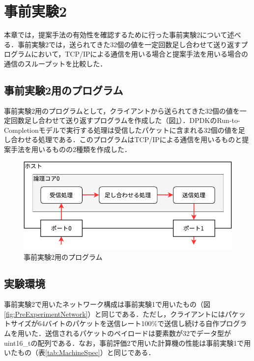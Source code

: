 \section{事前実験2}
\label{sec:PreExperimentTwo}
本章では，提案手法の有効性を確認するために行った事前実験2について述べる．事前実験2では，送られてきた32個の値を一定回数足し合わせて送り返すプログラムにおいて，TCP/IPによる通信を用いる場合と提案手法を用いる場合の通信のスループットを比較した．

\subsection{事前実験2用のプログラム}
事前実験2用のプログラムとして，クライアントから送られてきた32個の値を一定回数足し合わせて送り返すプログラムを作成した（図\ref{fig:PreExperimentTwo}）．DPDKのRun-to-Completionモデルで実行する処理は受信したパケットに含まれる32個の値を足し合わせる処理である．このプログラムはTCP/IPによる通信を用いるものと提案手法を用いるものの2種類を作成した．

\begin{figure}[htb]
  \centering
  \includegraphics[width=\columnwidth]{pictures/PreExperimentTwo.pdf}
  \caption{事前実験2用のプログラム}
  \label{fig:PreExperimentTwo}
\end{figure}

\subsection{実験環境}
事前実験2で用いたネットワーク構成は事前実験1で用いたもの（図\ref{fig:PreExperimentNetwork}）と同じである．ただし，クライアントにはパケットサイズが64バイトのパケットを送信レート100\%で送信し続ける自作プログラムを用いた．送信されるパケットのペイロードは要素数が32でデータ型がuint16\_tの配列である．なお，事前評価2で用いた計算機の性能は事前実験1で用いたもの（表\ref{tab:MachineSpec}）と同じである．


